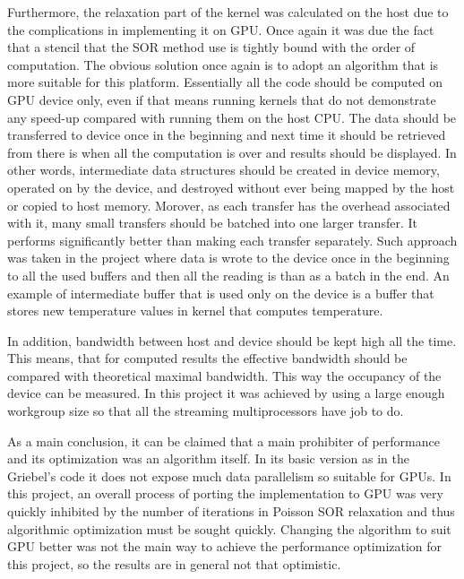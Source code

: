 
Furthermore, the relaxation part of the kernel was calculated on the host due to the complications in implementing it on GPU. Once again it was due the fact that a stencil that the SOR method use is tightly bound with the order of computation. The obvious solution once again is to adopt an algorithm that is more suitable for this platform. Essentially all the code should be computed on GPU device only, even if that means running kernels that do not demonstrate any speed-up compared with running them on the host CPU. The data should be transferred to device once in the beginning and next time it should be retrieved from there is when all the computation is over and results should be displayed. In other words, intermediate data structures should be created in device memory, operated on by the device, and destroyed without ever being mapped by the host or copied to host memory.\cite{nvidia2011openclbest} Morover, as each transfer has the overhead associated with it, many small transfers should be batched into one larger transfer. It performs significantly better than making each transfer separately.\cite{nvidia2011openclbest} Such approach was taken in the project where data is wrote to the device once in the beginning to all the used buffers and then all the reading is than as a batch in the end. An example of intermediate buffer that is used only on the device is a buffer that stores new temperature values in kernel that computes temperature. 

In addition, bandwidth between host and device should be kept high all the time. This means, that for computed results the effective bandwidth should be compared with theoretical maximal bandwidth. This way the occupancy of the device can be measured. In this project it was achieved by using a large enough workgroup size so that all the streaming multiprocessors have job to do.

As a main conclusion, it can be claimed that a main prohibiter of performance and its optimization was an algorithm itself. In its basic version as in the Griebel's code it does not expose much data parallelism so suitable for GPUs. In this project, an overall process of porting the implementation to GPU was very quickly inhibited by the number of iterations in Poisson SOR relaxation and thus algorithmic optimization must be sought quickly. Changing the algorithm to suit GPU better was not the main way to achieve the performance optimization for this project, so the results are in general not that optimistic.

